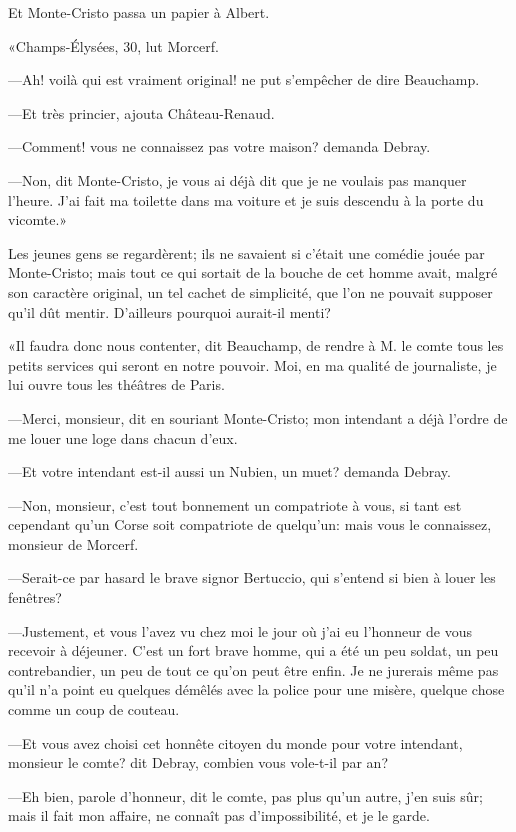 Et Monte-Cristo passa un papier à Albert. 

«Champs-Élysées, 30, lut Morcerf.  

—Ah! voilà qui est vraiment original! ne put s'empêcher de dire Beauchamp. 

—Et très princier, ajouta Château-Renaud. 

—Comment! vous ne connaissez pas votre maison? demanda Debray. 

—Non, dit Monte-Cristo, je vous ai déjà dit que je ne voulais pas manquer l'heure. J'ai fait ma toilette dans ma voiture et je suis descendu à la porte du vicomte.» 

Les jeunes gens se regardèrent; ils ne savaient si c'était une comédie jouée par Monte-Cristo; mais tout ce qui sortait de la bouche de cet homme avait, malgré son caractère original, un tel cachet de simplicité, que l'on ne pouvait supposer qu'il dût mentir. D'ailleurs pourquoi aurait-il menti? 

«Il faudra donc nous contenter, dit Beauchamp, de rendre à M. le comte tous les petits services qui seront en notre pouvoir. Moi, en ma qualité de journaliste, je lui ouvre tous les théâtres de Paris. 

—Merci, monsieur, dit en souriant Monte-Cristo; mon intendant a déjà l'ordre de me louer une loge dans chacun d'eux. 

—Et votre intendant est-il aussi un Nubien, un muet? demanda Debray. 

—Non, monsieur, c'est tout bonnement un compatriote à vous, si tant est cependant qu'un Corse soit compatriote de quelqu'un: mais vous le connaissez, monsieur de Morcerf. 

—Serait-ce par hasard le brave signor Bertuccio, qui s'entend si bien à louer les fenêtres? 

—Justement, et vous l'avez vu chez moi le jour où j'ai eu l'honneur de vous recevoir à déjeuner. C'est un fort brave homme, qui a été un peu soldat, un peu contrebandier, un peu de tout ce qu'on peut être enfin. Je ne jurerais même pas qu'il n'a point eu quelques démêlés avec la police pour une misère, quelque chose comme un coup de couteau. 

—Et vous avez choisi cet honnête citoyen du monde pour votre intendant, monsieur le comte? dit Debray, combien vous vole-t-il par an? 

—Eh bien, parole d'honneur, dit le comte, pas plus qu'un autre, j'en suis sûr; mais il fait mon affaire, ne connaît pas d'impossibilité, et je le garde. 

